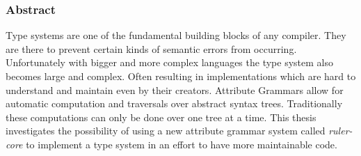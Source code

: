 \newpage
\thispagestyle{headings}
\mbox{}

\newpage
\thispagestyle{headings}
\mbox{}

\begin{center} \subsubsection*{Abstract} \end{center}
Type systems are one of the fundamental building blocks of any compiler. They are there to prevent certain kinds of semantic errors from occurring. Unfortunately with bigger and more complex languages the type system also becomes large and complex. Often resulting in implementations which are hard to understand and maintain even by their creators.
Attribute Grammars allow for automatic computation and traversals over abstract syntax trees. Traditionally these computations can only be done over one tree at a time. This thesis investigates the possibility of using a new attribute grammar system called \emph{ruler-core} to implement a type system in an effort to have more maintainable code.
